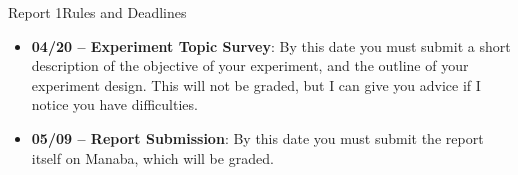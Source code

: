\documentclass{beamer}
\begin{document}
\begin{CJK}{UTF8}{ipxm}
\begin{frame}{Report 1}{Rules and Deadlines}
  \begin{itemize}
    \item {\bf 04/20 -- Experiment Topic Survey}: By this date you must submit a short description of the objective of your experiment, and the outline of your experiment design. This will not be graded, but I can give you advice if I notice you have difficulties.\bigskip

    \item {\bf 05/09 -- Report Submission}: By this date you must submit the report itself on Manaba, which will be graded.
  \end{itemize}
\end{frame}




\end{CJK}
\end{document}

